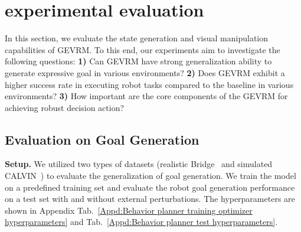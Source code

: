 \vspace{-2em}
\section{experimental evaluation}
 \vspace{-0.5em}
In this section, we evaluate the state generation and visual manipulation capabilities of GEVRM.
%
To this end, our experiments aim to investigate the following questions:
%
\textbf{1)} Can GEVRM have strong generalization ability to generate expressive goal in various environments?
\textbf{2)} Does GEVRM exhibit a higher success rate in executing robot tasks compared to the baseline in various environments?
\textbf{3)} How important are the core components of the GEVRM for achieving robust decision action?

 \vspace{-0.5em}
\subsection{Evaluation on Goal Generation}
\label{sec: exp_video_generation}




\textbf{Setup.} 
We utilized two types of datasets (realistic Bridge~\citep{walke2023bridgedata} and simulated CALVIN~\citep{mees2022calvin}) to evaluate the generalization of goal generation. 
We train the model on a predefined training set and evaluate the robot goal generation performance on a test set with and without external perturbations.
The hyperparameters are shown in Appendix Tab.~\ref{Appd:Behavior planner training optimizer hyperparameters} and Tab.~\ref{Appd:Behavior planner test hyperparameters}.

